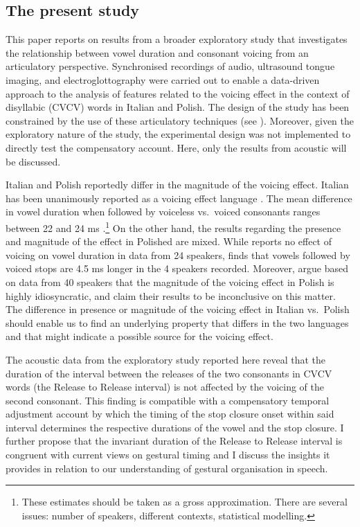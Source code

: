 \documentclass[preprint]{JASAnew}
\begin{document}
\hypertarget{the-present-study}{%
\subsection{The present study}\label{the-present-study}}

This paper reports on results from a broader exploratory study that
investigates the relationship between vowel duration and consonant
voicing from an articulatory perspective. Synchronised recordings of
audio, ultrasound tongue imaging, and electroglottography were carried
out to enable a data-driven approach to the analysis of features related
to the voicing effect in the context of disyllabic (CVCV) words in
Italian and Polish. The design of the study has been constrained by the
use of these articulatory techniques (see ). Moreover,
given the exploratory nature of the study, the experimental design was
not implemented to directly test the compensatory account. Here, only
the results from acoustic will be discussed.

Italian and Polish reportedly differ in the magnitude of the voicing
effect. Italian has been unanimously reported as a voicing effect
language \citep{caldognetto1979, farnetani1986, esposito2002}. The mean
difference in vowel duration when followed by voiceless vs.~voiced
consonants ranges between 22 and 24 ms \citep[with longer vowels
followed by voiced
consonants,][]{farnetani1986, esposito2002}.\footnote{These estimates should be taken as a gross approximation.
There are several issues: number of speakers, different contexts, statistical modelling.}
On the other hand, the results regarding the presence and magnitude of
the effect in Polished are mixed. While \citet{keating1984} reports no
effect of voicing on vowel duration in data from 24 speakers,
\citet{nowak2006} finds that vowels followed by voiced stops are 4.5 ms
longer in the 4 speakers recorded. Moreover, \citet{malisz2008} argue
based on data from 40 speakers that the magnitude of the voicing effect
in Polish is highly idiosyncratic, and claim their results to be
inconclusive on this matter. The difference in presence or magnitude of
the voicing effect in Italian vs.~Polish should enable us to find an
underlying property that differs in the two languages and that might
indicate a possible source for the voicing effect.

The acoustic data from the exploratory study reported here reveal that
the duration of the interval between the releases of the two consonants
in CVCV words (the Release to Release interval) is not affected by the
voicing of the second consonant. This finding is compatible with a
compensatory temporal adjustment account by which the timing of the stop
closure onset within said interval determines the respective durations
of the vowel and the stop closure. I further propose that the invariant
duration of the Release to Release interval is congruent with current
views on gestural timing \citep{goldstein2014} and I discuss the
insights it provides in relation to our understanding of gestural
organisation in speech.
\end{document}
